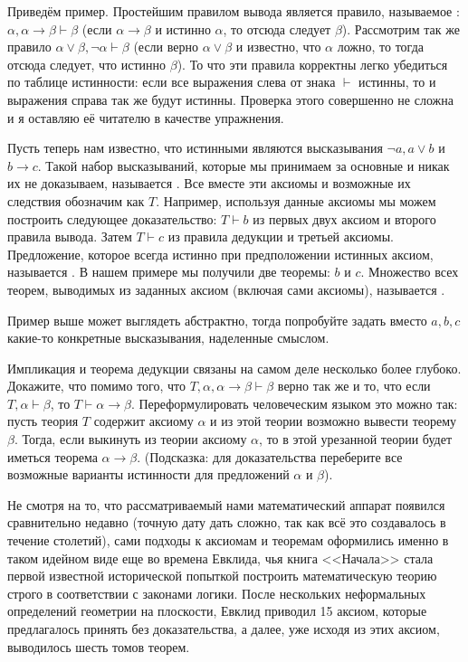 Приведём пример. Простейшим правилом вывода является правило, называемое : $\alpha, \alpha\to\beta \vdash \beta$ (если $\alpha\to\beta$ и истинно $\alpha$, то отсюда следует $\beta$). Рассмотрим так же правило $\alpha\lor\beta, \neg\alpha \vdash \beta$ (если верно $\alpha\lor\beta$ и известно, что $\alpha$ ложно, то тогда отсюда следует, что истинно $\beta$). То что эти правила корректны легко убедиться по таблице истинности: если все выражения слева от знака $\vdash$ истинны, то и выражения справа так же будут истинны. Проверка этого совершенно не сложна и я оставляю её читателю в качестве упражнения.

Пусть теперь нам известно, что истинными являются высказывания $\neg a, a\lor b$ и $b\to c$. Такой набор высказываний, которые мы принимаем за основные и никак их не доказываем, называется . Все вместе эти аксиомы и возможные их следствия обозначим как $T$. Например, используя данные аксиомы мы можем построить следующее доказательство: $T\vdash b$ из первых двух аксиом и второго правила вывода. Затем $T\vdash c$ из правила дедукции и третьей аксиомы. Предложение, которое всегда истинно при предположении истинных аксиом, называется . В нашем примере мы получили две теоремы: $b$ и $c$. Множество всех теорем, выводимых из заданных аксиом (включая сами аксиомы), называется .

\begin{exercise}
Пример выше может выглядеть абстрактно, тогда попробуйте задать вместо $a, b, c$ какие-то конкретные высказывания, наделенные смыслом.
\end{exercise}

\begin{exercise}
Импликация и теорема дедукции связаны на самом деле несколько более глубоко. Докажите, что помимо того, что $T, \alpha, \alpha\to\beta\vdash \beta$ верно так же и то, что если $T, \alpha \vdash \beta$, то $T \vdash \alpha\to\beta$. Переформулировать человеческим языком это можно так: пусть теория $T$ содержит аксиому $\alpha$ и из этой теории возможно вывести теорему $\beta$. Тогда, если выкинуть из теории аксиому $\alpha$, то в этой урезанной теории будет иметься теорема $\alpha\to\beta$. (Подсказка: для доказательства переберите все возможные варианты истинности для предложений $\alpha$ и $\beta$).
\end{exercise}

Не смотря на то, что рассматриваемый нами математический аппарат появился сравнительно недавно (точную дату дать сложно, так как всё это создавалось в течение столетий), сами подходы к аксиомам и теоремам оформились именно в таком идейном виде еще во времена Евклида, чья книга <<Начала>> стала первой известной исторической попыткой построить математическую теорию строго в соответствии с законами логики. После нескольких неформальных определений геометрии на плоскости, Евклид приводил 15 аксиом, которые предлагалось принять без доказательства, а далее, уже исходя из этих аксиом, выводилось шесть томов теорем.

